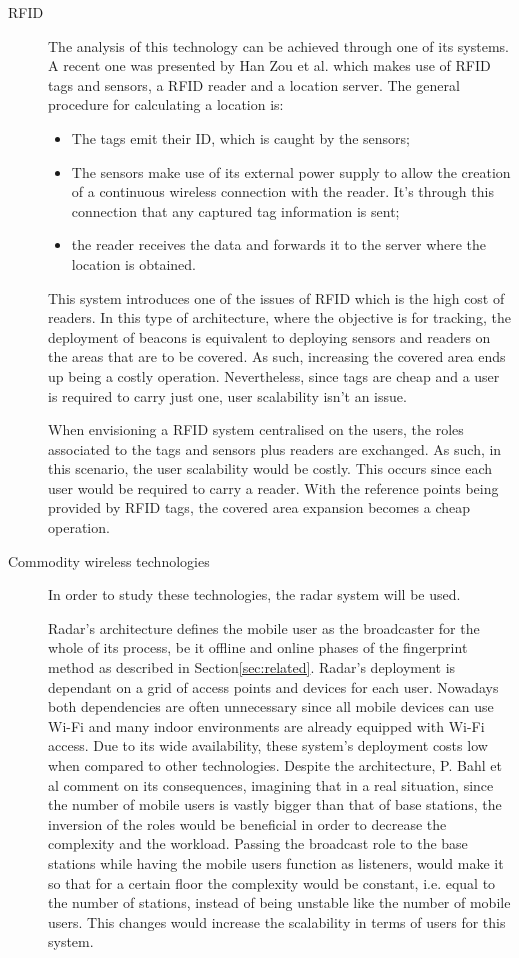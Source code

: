  
\begin{description} 
\item [\acf{RFID}]  The analysis of this technology can be achieved through one of its systems. A recent one was presented by Han Zou et al. \cite{rfid_sys} which makes use of RFID tags and sensors, a \ac{RFID} reader and a location server. The general procedure for calculating a location is:  
\begin{itemize} 
\item The tags emit their ID, which is caught by the sensors; 
\item The sensors make use of its external power supply to allow the creation of a continuous wireless connection with the reader. It's through this connection that any captured tag information is sent; 
\item the reader receives the data and forwards it to the server where the location is obtained. 
\end{itemize} 
This system introduces one of the issues of RFID which is the high cost of readers. 
In this type of architecture, where the objective is for tracking, the deployment of beacons is equivalent to deploying sensors and readers on the areas that are to be covered. As such, increasing the covered area ends up being a costly operation. Nevertheless, since tags are cheap and a user is required to carry just one, user scalability isn't an issue. 
 
 
When envisioning a \ac{RFID} system centralised on the users, the roles associated to the tags and sensors plus readers are exchanged. As such, in this scenario, the user scalability would be costly. This occurs since each user would be required to carry a reader. With the reference points being provided by \ac{RFID} tags, the covered area expansion becomes a cheap operation. 
 
 
\item[Commodity wireless technologies] In order to study these technologies, the radar system will be used. 
 
 
Radar's architecture defines the mobile user as the broadcaster for the whole of its process, be it offline and online phases of the fingerprint method as described in Section\ref{sec:related}. Radar's deployment is dependant on a grid of access points and devices for each user. Nowadays both dependencies are often unnecessary since all mobile devices can use Wi-Fi and many indoor environments are already equipped with Wi-Fi access. Due to its wide availability, these system's deployment costs low when compared to other technologies.  
Despite the architecture, P. Bahl et al\cite{radar1} comment on its consequences, imagining that in a real situation, since the number of mobile users is vastly bigger than that of base stations, the inversion of the roles would be beneficial in order to decrease the complexity and the workload. 
Passing the broadcast role to the base stations while having the mobile users function as listeners, would make it so that for a certain floor the complexity would be constant, i.e. equal to the number of stations, instead of being unstable like the number of mobile users. This changes would increase the scalability in terms of users for this system. 
 

\end{description}
